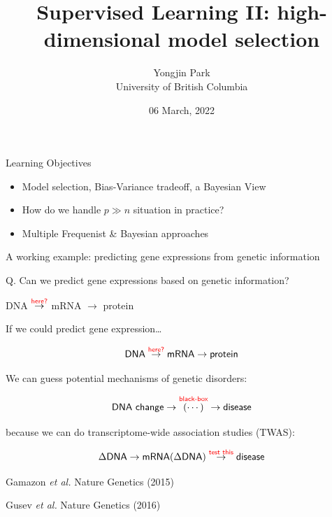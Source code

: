 \documentclass[
  ignorenonframetext,
  aspectratio=169]{beamer}
\title{Supervised Learning II: high-dimensional model selection}
\author{Yongjin Park\\
University of British Columbia}
\date{06 March, 2022}
\begin{document}
\frame{\titlepage}

\begin{frame}{Learning Objectives}
\protect\hypertarget{learning-objectives}{}
\large

\begin{itemize}
\item
  Model selection, Bias-Variance tradeoff, a Bayesian View
\item
  How do we handle \(p \gg n\) situation in practice?
\item
  Multiple Frequenist \& Bayesian approaches
\end{itemize}
\end{frame}

\begin{frame}{A working example: predicting gene expressions from
genetic information}
\protect\hypertarget{a-working-example-predicting-gene-expressions-from-genetic-information}{}
\Large

Q. Can we predict gene expressions based on genetic information?

\centering

DNA \(\overset{\textsf{\color{red} here?}}{\to}\) mRNA \(\to\) protein
\end{frame}

\begin{frame}{If we could predict gene expression\ldots{}}
\protect\hypertarget{if-we-could-predict-gene-expression}{}
\Large

\[\textsf{DNA} \overset{\textsf{\color{red} here?}}{\to} \textsf{mRNA} \to \textsf{protein}\]

\normalsize

We can guess potential mechanisms of genetic disorders:

\Large

\[\textsf{DNA change} \to \overset{\textsf{\color{red} black-box}}{(\cdots)} \to \textsf{disease}\]

\normalsize

because we can do transcriptome-wide association studies (TWAS):

\Large

\[\Delta\textsf{DNA} \to \textsf{mRNA}(\Delta \textsf{DNA}) \overset{\textsf{\color{red} test this}}{\to} \textsf{disease}\]

\tiny Gamazon \emph{et al.} Nature Genetics (2015)

\tiny Gusev \emph{et al.} Nature Genetics (2016)
\end{frame}
\end{document}
